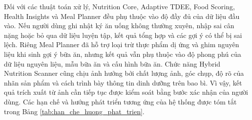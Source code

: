 \documentclass[12pt, a4paper]{report}
\begin{document}
Đối với các thuật toán xử lý, Nutrition Core, Adaptive TDEE, Food Scoring, Health Insights và Meal Planner đều phụ thuộc vào độ đầy đủ của dữ liệu đầu vào. Nếu người dùng ghi nhật ký ăn uống không thường xuyên, nhập sai cân nặng hoặc bỏ qua dữ liệu luyện tập, kết quả tổng hợp và các gợi ý có thể bị sai lệch. Riêng Meal Planner đã hỗ trợ loại trừ thực phẩm dị ứng và ghim nguyên liệu khi sinh gợi ý bữa ăn, nhưng kết quả vẫn phụ thuộc vào độ phong phú của dữ liệu nguyên liệu, mẫu bữa ăn và cấu hình bữa ăn. Chức năng Hybrid Nutrition Scanner cũng chịu ảnh hưởng bởi chất lượng ảnh, góc chụp, độ rõ của nhãn sản phẩm và cách trình bày thông tin dinh dưỡng trên bao bì. Vì vậy, kết quả trích xuất từ ảnh cần tiếp tục được kiểm soát bằng bước xác nhận của người dùng. Các hạn chế và hướng phát triển tương ứng của hệ thống được tóm tắt trong Bảng \ref{tab:han_che_huong_phat_trien}.
\end{document}
